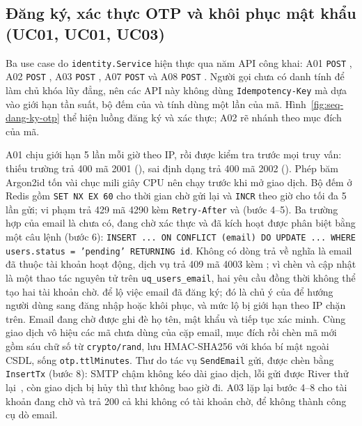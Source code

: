 \subsection{Đăng ký, xác thực OTP và khôi phục mật khẩu (UC01, UC01, UC03)}\label{sssec:ht-dang-ky}

Ba use case do \texttt{identity.Service} hiện thực qua năm API công khai: A01 \texttt{POST} , A02 \texttt{POST} , A03 \texttt{POST} , A07 \texttt{POST}  và A08 \texttt{POST} . Người gọi chưa có danh tính để làm chủ khóa lũy đẳng, nên các API này không dùng \texttt{Idempotency-Key} mà dựa vào giới hạn tần suất, bộ đếm của  và tính dùng một lần của mã. Hình~\ref{fig:seq-dang-ky-otp} thể hiện luồng đăng ký và xác thực; A02 rẽ nhánh theo mục đích của mã.


A01 chịu giới hạn 5 lần mỗi giờ theo IP, rồi được kiểm tra  trước mọi truy vấn: thiếu trường trả 400 mã 2001 (), sai định dạng trả 400 mã 2002 (). Phép băm Argon2id tốn vài chục mili giây CPU nên chạy trước khi mở giao dịch. Bộ đếm  ở Redis gồm \texttt{SET NX EX 60} cho thời gian chờ gửi lại và \texttt{INCR} theo giờ cho tối đa 5 lần gửi; vi phạm trả 429 mã 4290 kèm \texttt{Retry-After} và  (bước 4--5). Ba trường hợp của email là chưa có, đang chờ xác thực và đã kích hoạt được phân biệt bằng một câu lệnh (bước 6): \texttt{INSERT ... ON CONFLICT (email) DO UPDATE ... WHERE users.status = 'pending' RETURNING id}. Không có dòng trả về nghĩa là email đã thuộc tài khoản hoạt động, dịch vụ trả 409 mã 4003 kèm ; vì chèn và cập nhật là một thao tác nguyên tử trên \texttt{uq\_users\_email}, hai yêu cầu đồng thời không thể tạo hai tài khoản chờ.  để lộ việc email đã đăng ký; đó là chủ ý của  để hướng người dùng sang đăng nhập hoặc khôi phục, và mức lộ bị giới hạn theo IP chặn trên. Email đang chờ được ghi đè họ tên, mật khẩu và tiếp tục xác minh. Cùng giao dịch vô hiệu các mã chưa dùng của cặp email, mục đích rồi chèn mã mới gồm sáu chữ số từ \texttt{crypto/rand}, lưu HMAC-SHA256 với khóa bí mật ngoài CSDL, sống \texttt{otp.ttlMinutes}. Thư do tác vụ \texttt{SendEmail} gửi, được chèn bằng \texttt{InsertTx} (bước 8): SMTP chậm không kéo dài giao dịch, lỗi gửi được River thử lại~\cite{river}, còn giao dịch bị hủy thì thư không bao giờ đi. A03 lặp lại bước 4--8 cho tài khoản đang chờ và trả 200 cả khi không có tài khoản chờ, để không thành công cụ dò email.

